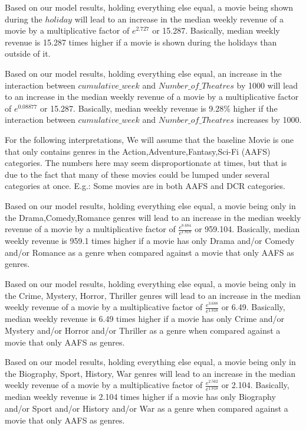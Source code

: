 \documentclass[11pt]{article} %
\begin{document}
Based on our model results, holding everything else equal, a movie being shown during the $holiday$ will lead to an increase in the median weekly revenue of a movie by a multiplicative factor of $e^{2.727}$ or 15.287. Basically, median weekly revenue is 15.287 times higher if a movie is shown during the holidays than outside of it.

Based on our model results, holding everything else equal, an increase in the interaction between $cumulative\_week$ and $Number\_of\_Theatres$ by 1000 will lead to an increase in the median weekly revenue of a movie by a multiplicative factor of $e^{0.08877}$ or 15.287. Basically, median weekly revenue is 9.28\% higher if the interaction between $cumulative\_week$ and $Number\_of\_Theatres$ increases by 1000.

For the following interpretations, We will assume that the baseline Movie is one that only contains genres in the Action,Adventure,Fantasy,Sci-Fi (AAFS) categories. The numbers here may seem disproportionate at times, but that is due to the fact that many of these movies could be lumped under several categories at once. E.g.: Some movies are in both AAFS and DCR categories.


Based on our model results, holding everything else equal, a movie being only in the Drama,Comedy,Romance genres will lead to an increase in the median weekly revenue of a movie by a multiplicative factor of $\frac{e^{8.684}}{e^{1.818}}$ or 959.104. Basically, median weekly revenue is 959.1 times  higher if a movie has only Drama and/or Comedy and/or Romance as a genre when compared against a movie that only AAFS as genres.

Based on our model results, holding everything else equal, a movie being only in the Crime, Mystery, Horror, Thriller  genres will lead to an increase in the median weekly revenue of a movie by a multiplicative factor of $\frac{e^{3.688}}{e^{1.818}}$ or 6.49. Basically, median weekly revenue is 6.49 times  higher if a movie has only Crime and/or Mystery and/or Horror and/or Thriller as a genre when compared against a movie that only AAFS as genres.

Based on our model results, holding everything else equal, a movie being only in the Biography, Sport, History, War genres will lead to an increase in the median weekly revenue of a movie by a multiplicative factor of $\frac{e^{2.562}}{e^{1.818}}$ or 2.104. Basically, median weekly revenue is 2.104 times  higher if a movie has only Biography and/or Sport and/or History and/or War as a genre when compared against a movie that only AAFS as genres.
\end{document}
